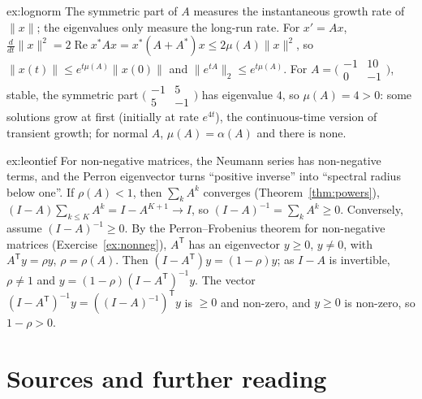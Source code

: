 \begin{solution}{ex:lognorm}
\idea The symmetric part of $A$ measures the instantaneous growth rate of $\|x\|$; the eigenvalues only measure the long-run rate.
\writeup For $x'=Ax$, $\frac d{dt}\|x\|^2=2\operatorname{Re}x^*Ax=x^*(A+A^*)x\le2\mu(A)\|x\|^2$, so $\|x(t)\|\le e^{t\mu(A)}\|x(0)\|$ and $\|e^{tA}\|_2\le
e^{t\mu(A)}$. For $A=\bigl(\begin{smallmatrix}-1&10\\0&-1\end{smallmatrix}\bigr)$, stable, the symmetric part $\bigl(\begin{smallmatrix}-1&5\\5&-1\end{smallmatrix}
\bigr)$ has eigenvalue $4$, so $\mu(A)=4>0$: some solutions grow at first (initially at rate $e^{4t}$), the continuous-time version of
transient growth; for normal $A$, $\mu(A)=\alpha(A)$ and there is none.
\end{solution}

\begin{solution}{ex:leontief}
\idea For non-negative matrices, the Neumann series has non-negative terms, and the Perron eigenvector turns ``positive inverse'' into
``spectral radius below one''.
\writeup If $\rho(A)<1$, then $\sum_kA^k$ converges (Theorem~\ref{thm:powers}), $(I-A)\sum_{k\le K}A^k=I-A^{K+1}\to I$, so $(I-A)^{-1}=\sum_kA^k\ge0$.
Conversely, assume $(I-A)^{-1}\ge0$. By the Perron--Frobenius theorem for non-negative matrices (Exercise~\ref{ex:nonneg}), $A^{\mathsf T}$ has an
eigenvector $y\ge0$, $y\ne0$, with $A^{\mathsf T}y=\rho y$, $\rho=\rho(A)$. Then $(I-A^{\mathsf T})y=(1-\rho)y$; as $I-A$ is invertible, $\rho\ne1$ and
$y=(1-\rho)(I-A^{\mathsf T})^{-1}y$. The vector $(I-A^{\mathsf T})^{-1}y=((I-A)^{-1})^{\mathsf T}y$ is $\ge0$ and non-zero, and $y\ge0$ is non-zero, so
$1-\rho>0$.
\end{solution}

\section*{Sources and further reading}

